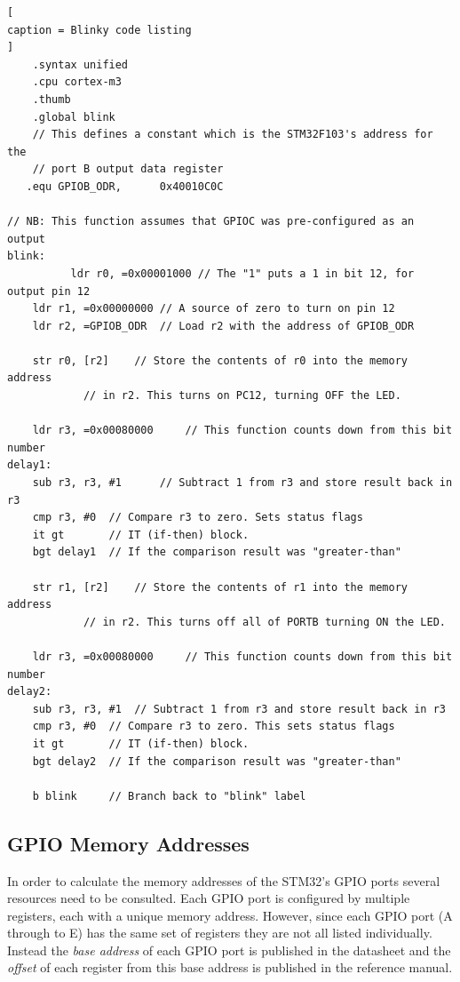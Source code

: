 \documentclass{UoNMCHA}
\numberwithin{equation}{section}
\begin{document}
\begin{lstlisting}[
caption = Blinky code listing
]
    .syntax unified
    .cpu cortex-m3
    .thumb
    .global blink
    // This defines a constant which is the STM32F103's address for the
    // port B output data register
   .equ	GPIOB_ODR,  	0x40010C0C

// NB: This function assumes that GPIOC was pre-configured as an output
blink:
          ldr r0, =0x00001000 // The "1" puts a 1 in bit 12, for output pin 12
	ldr r1, =0x00000000 // A source of zero to turn on pin 12
	ldr r2, =GPIOB_ODR  // Load r2 with the address of GPIOB_ODR

	str r0, [r2] 	// Store the contents of r0 into the memory address
			// in r2. This turns on PC12, turning OFF the LED.

	ldr r3, =0x00080000 	// This function counts down from this bit number
delay1:
	sub r3, r3, #1   	// Subtract 1 from r3 and store result back in r3
	cmp r3, #0	// Compare r3 to zero. Sets status flags
	it gt		// IT (if-then) block.
	bgt delay1	// If the comparison result was "greater-than"

	str r1, [r2]	// Store the contents of r1 into the memory address
			// in r2. This turns off all of PORTB turning ON the LED.

	ldr r3, =0x00080000 	// This function counts down from this bit number
delay2:
	sub r3, r3, #1	// Subtract 1 from r3 and store result back in r3
	cmp r3, #0	// Compare r3 to zero. This sets status flags
	it gt		// IT (if-then) block.
	bgt delay2	// If the comparison result was "greater-than"

	b blink		// Branch back to "blink" label
\end{lstlisting}


\pagebreak

\subsection{GPIO Memory Addresses}

In order to calculate the memory addresses of the STM32's GPIO ports several resources need to be consulted. Each GPIO port is configured by multiple registers, each with a unique memory address. However, since each GPIO port (A through to E) has the same set of registers they are not all listed individually. Instead the \textit{base address} of each GPIO port is published in the datasheet and the \textit{offset} of each register from this base address is published in the reference manual.
\end{document}
